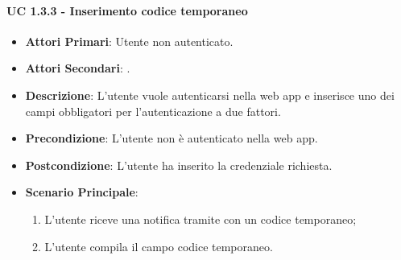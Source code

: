 			\paragraph{UC 1.3.3 - Inserimento codice temporaneo}
			\begin{itemize}
				\item \textbf{Attori Primari}: Utente non autenticato.
				\item \textbf{Attori Secondari}: .
				\item \textbf{Descrizione}: L'utente vuole autenticarsi nella web app e inserisce uno dei campi obbligatori per l'autenticazione a due fattori.
				\item \textbf{Precondizione}: L'utente non è autenticato nella web app.
				\item \textbf{Postcondizione}: L'utente ha inserito la credenziale richiesta.
				\item \textbf{Scenario Principale}:
				\begin{enumerate}
					\item L'utente riceve una notifica tramite  con un codice temporaneo;
					\item L'utente compila il campo codice temporaneo.
				\end{enumerate}	
			\end{itemize}

